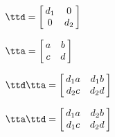 {$\ttd = \left[\hskip -3pt \begin{array}{cc} d_1&0\\  0&d_2\end{array}\hskip -3pt
 \right]$
 
$\tta = \left[\hskip -3pt \begin{array}{cc} a&b\\  c&d\end{array}\hskip -3pt
 \right] $}
{$\ttd\tta= \left[\hskip -3pt \begin{array}{cc} d_1a&d_1b\\  d_2c&d_2d\end{array}\hskip -3pt
 \right] $

$\tta\ttd =  \left[\hskip -3pt \begin{array}{cc} d_1a&d_2b\\  d_1c&d_2d\end{array}\hskip -3pt \right]$
}
  
